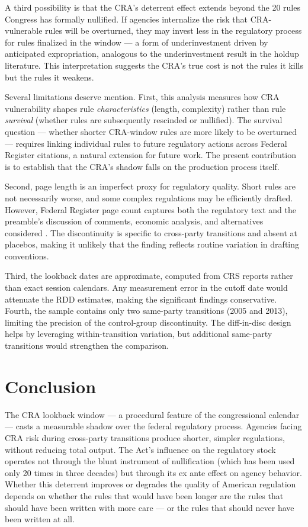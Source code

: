 \documentclass[12pt]{article}
\begin{document}
A third possibility is that the CRA's deterrent effect extends beyond the 20 rules Congress has formally nullified. If agencies internalize the risk that CRA-vulnerable rules will be overturned, they may invest less in the regulatory process for rules finalized in the window --- a form of underinvestment driven by anticipated expropriation, analogous to the underinvestment result in the holdup literature. This interpretation suggests the CRA's true cost is not the rules it kills but the rules it weakens.

Several limitations deserve mention. First, this analysis measures how CRA vulnerability shapes rule \textit{characteristics} (length, complexity) rather than rule \textit{survival} (whether rules are subsequently rescinded or nullified). The survival question --- whether shorter CRA-window rules are more likely to be overturned --- requires linking individual rules to future regulatory actions across Federal Register citations, a natural extension for future work. The present contribution is to establish that the CRA's shadow falls on the production process itself.

Second, page length is an imperfect proxy for regulatory quality. Short rules are not necessarily worse, and some complex regulations may be efficiently drafted. However, Federal Register page count captures both the regulatory text and the preamble's discussion of comments, economic analysis, and alternatives considered \citep{coglianese2004}. The discontinuity is specific to cross-party transitions and absent at placebos, making it unlikely that the finding reflects routine variation in drafting conventions.

Third, the lookback dates are approximate, computed from CRS reports rather than exact session calendars. Any measurement error in the cutoff date would attenuate the RDD estimates, making the significant findings conservative. Fourth, the sample contains only two same-party transitions (2005 and 2013), limiting the precision of the control-group discontinuity. The diff-in-disc design helps by leveraging within-transition variation, but additional same-party transitions would strengthen the comparison.

\section{Conclusion}

The CRA lookback window --- a procedural feature of the congressional calendar --- casts a measurable shadow over the federal regulatory process. Agencies facing CRA risk during cross-party transitions produce shorter, simpler regulations, without reducing total output. The Act's influence on the regulatory stock operates not through the blunt instrument of nullification (which has been used only 20 times in three decades) but through its ex ante effect on agency behavior. Whether this deterrent improves or degrades the quality of American regulation depends on whether the rules that would have been longer are the rules that should have been written with more care --- or the rules that should never have been written at all.
\end{document}
